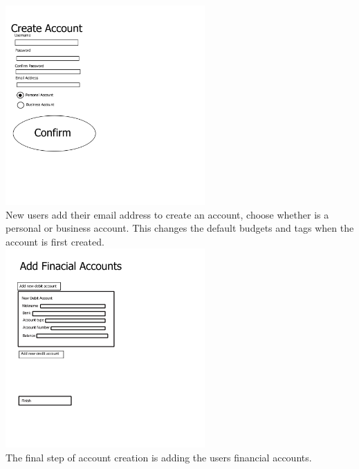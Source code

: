 \documentclass[12pt]{article}
\begin{document}
\includegraphics[width=3in]{create_account.jpg}\\
New users add their email address to create an account, choose whether is a personal or business account. This changes the default budgets and tags when the account is first created.\\

\includegraphics[width=3in]{first_time_add_bank_accounts.jpg}\\
The final step of account creation is adding the users financial accounts.\\
\end{document}
